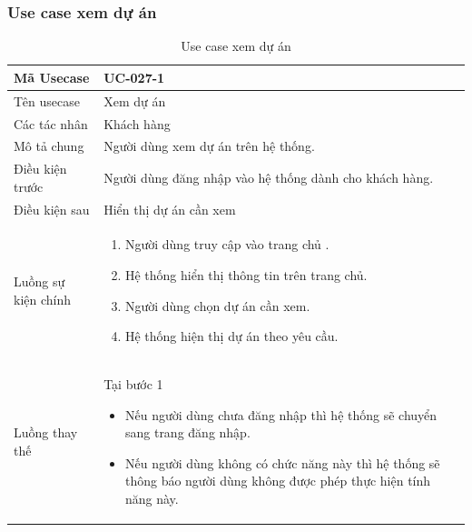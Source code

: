 \documentclass[12pt,a4paper]{article}
\begin{document}

    \subsubsection*{Use case xem dự án}
    \begin{table}[H]
        \centering
        \begin{tabular}{|p{3.5cm}|p{11.5cm}|c|}
            \hline
            Mã Usecase      & UC-027-1                                               \\
            \hline
            Tên usecase     & Xem dự án                                              \\
            \hline
            Các tác nhân    & Khách hàng                                             \\
            \hline
            Mô tả chung     & Người dùng xem dự án trên hệ thống.                    \\
            \hline

            Điều kiện trước & Người dùng đăng nhập vào hệ thống dành cho khách hàng. \\
            \hline

            Điều kiện sau   & Hiển thị dự án cần xem                                 \\
            \hline

            Luồng sự kiện chính & \vspace{-.8cm}\begin{enumerate}
                                                    \item Người dùng truy cập vào trang chủ .
                                                    \item Hệ thống hiển thị thông tin trên trang chủ.
                                                    \item Người dùng chọn dự án cần xem.
                                                    \item Hệ thống hiện thị dự án theo yêu cầu.
            \end{enumerate}
            \\
            \hline
            Luồng thay thế & Tại bước 1\newline
            \vspace{-.8cm}\begin{itemize}
                              \item Nếu người dùng chưa đăng nhập thì hệ thống sẽ chuyển sang trang đăng nhập.
                              \item Nếu người dùng không có chức năng này thì hệ thống sẽ thông báo người dùng không được phép thực hiện tính năng này.
            \end{itemize}

            \\ \hline
        \end{tabular}
        \caption{Use case xem dự án}

    \end{table}
\end{document}
